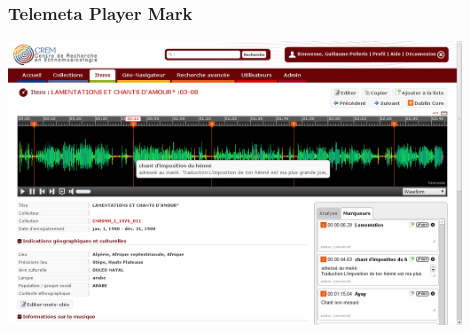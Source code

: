 \documentclass[10pt, final, hyperref, table]{beamer}
\begin{document}
\begin{frame}\frametitle{Telemeta Player Mark}
  \vspace{-1cm}
  \begin{center}
    \includegraphics[width=12cm]{../../Common/img/shots/player_mark.png}
  \end{center}
\end{frame}
\end{document}
